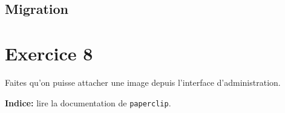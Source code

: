 \hypertarget{migration-1}{%
\subsection{Migration}\label{migration-1}}

\begin{english}

\begin{Shaded}
\begin{Highlighting}[]
\NormalTok{$ }
\end{Highlighting}
\end{Shaded}

\end{english}

\begin{english}

\begin{Shaded}
\begin{Highlighting}[]
 
\end{Highlighting}
\end{Shaded}

\end{english}

\hypertarget{exercice-8}{%
\section{Exercice 8}\label{exercice-8}}

Faites qu'on puisse attacher une image depuis l'interface
d'administration.

\begin{english}

\begin{Shaded}
\begin{Highlighting}[]
\NormalTok{$ }
\NormalTok{$ }
\NormalTok{$ }
\NormalTok{$ }
\end{Highlighting}
\end{Shaded}

\end{english}

\textbf{Indice:} lire la documentation de
\textenglish{\texttt{paperclip}}.

